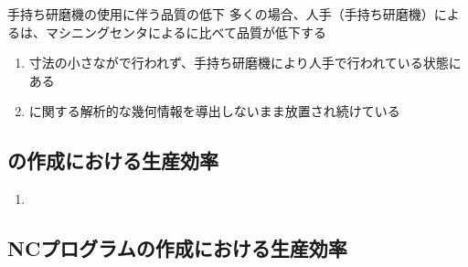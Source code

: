 \clearpage
\begin{Issues}{手持ち研磨機の使用に伴う品質の低下}
多くの場合、人手（手持ち研磨機）による\EndFaceChamferMilling は、マシニングセンタによる\EndFaceChamferMilling に比べて品質が低下する
\begin{enumerate}[label=\sarrow]
\item[{\sarrow[red]}]
寸法の小さな\EndFaceCChamferMilling が\MMC で行われず、手持ち研磨機により人手で行われている状態にある
\item[{\sarrow[red]}] \EndFaceChamferMilling に関する解析的な幾何情報を導出しないまま放置され続けている
\end{enumerate}
\end{Issues}


\clearpage


\subsection{\Drawing の作成における生産効率}

\begin{Issues}{\TBW}
\begin{enumerate}[label=\sarrow]
\item[{\sarrow[red]}]
\end{enumerate}
\end{Issues}


\subsection{NCプログラムの作成における生産効率}

